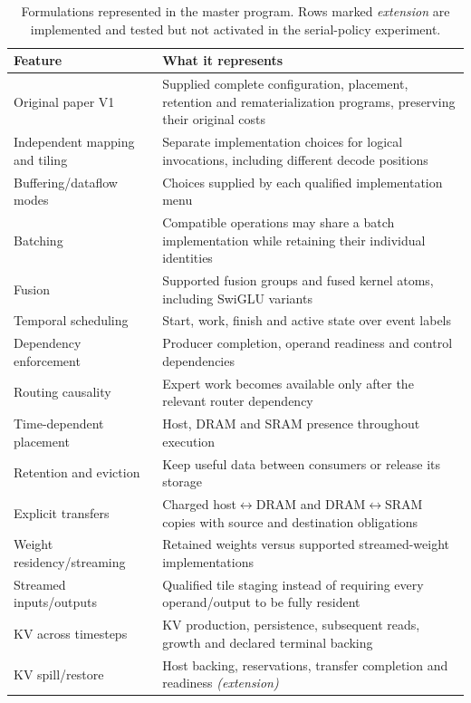 \begin{table}[t]
\centering
\scriptsize
\setlength{\tabcolsep}{4pt}
\caption{Formulations represented in the master program. Rows marked
\emph{extension} are implemented and tested but not activated in the
serial-policy experiment.}
\label{tab:master_features}
\begin{tabularx}{\linewidth}{@{}lX@{}}
\toprule
\textbf{Feature} & \textbf{What it represents} \\
\midrule
Original paper V1 & Supplied complete configuration, placement, retention and rematerialization programs, preserving their original costs \\
Independent mapping and tiling & Separate implementation choices for logical invocations, including different decode positions \\
Buffering/dataflow modes & Choices supplied by each qualified implementation menu \\
Batching & Compatible operations may share a batch implementation while retaining their individual identities \\
Fusion & Supported fusion groups and fused kernel atoms, including SwiGLU variants \\
Temporal scheduling & Start, work, finish and active state over event labels \\
Dependency enforcement & Producer completion, operand readiness and control dependencies \\
Routing causality & Expert work becomes available only after the relevant router dependency \\
Time-dependent placement & Host, DRAM and SRAM presence throughout execution \\
Retention and eviction & Keep useful data between consumers or release its storage \\
Explicit transfers & Charged host$\leftrightarrow$DRAM and DRAM$\leftrightarrow$SRAM copies with source and destination obligations \\
Weight residency/streaming & Retained weights versus supported streamed-weight implementations \\
Streamed inputs/outputs & Qualified tile staging instead of requiring every operand/output to be fully resident \\
KV across timesteps & KV production, persistence, subsequent reads, growth and declared terminal backing \\
KV spill/restore & Host backing, reservations, transfer completion and readiness \emph{(extension)} \\

\end{tabularx}
\end{table}
